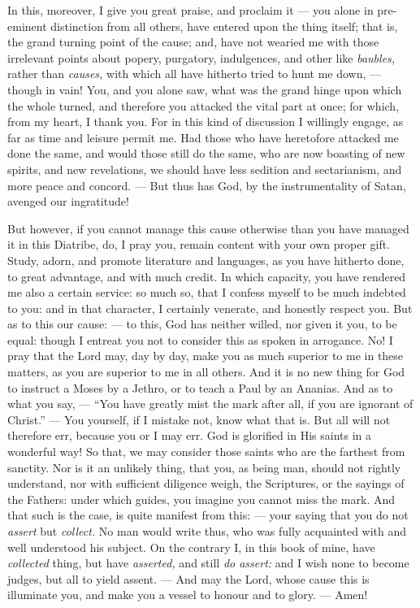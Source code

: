 In this, moreover, I give you great praise, and proclaim it — you alone in pre-eminent distinction from all others, have entered upon the thing itself; that is, the grand turning point of the cause; and, have not wearied me with those irrelevant points about popery, purgatory, indulgences, and other like \emph{baubles, }rather than \emph{causes, }with which all have hitherto tried to hunt me down, — though in vain! You, and you alone saw, what was the grand hinge upon which the whole turned, and therefore you attacked the vital part at once; for which, from my heart, I thank you. For in this kind of discussion I willingly engage, as far as time and leisure permit me. Had those who have heretofore attacked me done the same, and would those still do the same, who are now boasting of new spirits, and new revelations, we should have less sedition and sectarianism, and more peace and concord. — But thus has God, by the instrumentality of Satan, avenged our ingratitude!

But however, if you cannot manage this cause otherwise than you have managed it in this Diatribe, do, I pray you, remain content with your own proper gift. Study, adorn, and promote literature and languages, as you have hitherto done, to great advantage, and with much credit. In which capacity, you have rendered me also a certain service: so much so, that I confess myself to be much indebted to you: and in that character, I certainly venerate, and honestly respect you. But as to this our cause: — to this, God has neither willed, nor given it you, to be equal: though I entreat you not to consider this as spoken in arrogance. No! I pray that the Lord may, day by day, make you as much superior to me in these matters, as you are superior to me in all others. And it is no new thing for God to instruct a Moses by a Jethro, or to teach a Paul by an Ananias. And as to what you say, — “You have greatly mist the mark after all, if you are ignorant of Christ.” — You yourself, if I mistake not, know what that is. But all will not therefore err, because you or I may err. God is glorified in His saints in a wonderful way! So that, we may consider those saints who are the farthest from sanctity. Nor is it an unlikely thing, that you, as being man, should not rightly understand, nor with sufficient diligence weigh, the Scriptures, or the sayings of the Fathers: under which guides, you imagine you cannot miss the mark. And that such is the case, is quite manifest from this: — your saying that you do not \emph{assert }but \emph{collect. }No man would write thus, who was fully acquainted with and well understood his subject. On the contrary I, in this book of mine, have \emph{collected} thing, but have \emph{asserted, }and still \emph{do assert: }and I wish none to become judges, but all to yield assent. — And may the Lord, whose cause this is illuminate you, and make you a vessel to honour and to glory. — Amen!

